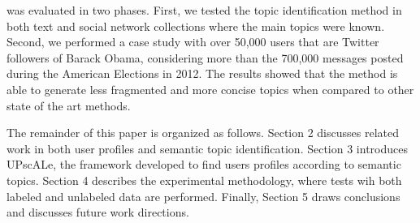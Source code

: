\method was evaluated in two phases. First, we tested the topic identification
method in both text and social network collections where the main topics were
known. Second, we performed a case study with over 50,000 users that are
Twitter followers of Barack Obama, considering more than the 700,000 messages
posted during the American Elections in 2012. The results showed that the
method is able to generate less fragmented and more concise topics when
compared to other state of the art methods.%


The remainder of this paper is organized as follows. Section 2 discusses related work in both user profiles and semantic topic identification. Section 3 introduces UPscALe, the framework developed to find users profiles according to semantic topics. Section 4 describes the experimental methodology, where tests wih both labeled and unlabeled data are performed. Finally, Section 5 draws conclusions and discusses future work directions.


